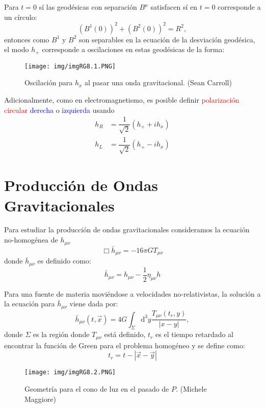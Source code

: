 \documentclass[../main]{subfiles}
\begin{document}
\begin{adjustwidth}{0pt}{-100pt}
Para $t=0$ sí las geodésicas con separación $B^{\mu}$ satisfacen sí en $t=0$ corresponde a un círculo:
\begin{equation}
    (B^1(0))^2+(B^2(0))^2=R^2,
\end{equation}
entonces como $B^1$ y $B^2$ son separables en la ecuación de la desviación geodésica, el modo $h_+$ corresponde a oscilaciones en estas geodésicas de la forma:

\begin{figure}[h]
    \begin{adjustwidth}{0pt}{-100pt}
    \centering
    \texttt{[image: img/imgRG8.1.PNG]}
    \label{fig8.1}
    \caption{Oscilación para $h_x$ al pasar una onda gravitacional. (Sean Carroll)}
    \end{adjustwidth}
\end{figure}

Adicionalmente, como en electromagnetismo, es posible definir \textcolor{red}{polarización circular} \textcolor{blue}{derecha} o \textcolor{blue}{izquierda} usando 
\begin{align}
    h_R&=\dfrac{1}{\sqrt{2}}(h_+ +ih_x)\\
    h_L&=\dfrac{1}{\sqrt{2}}(h_+ -ih_x)
\end{align}

\section{Producción de Ondas Gravitacionales}\label{part8.3}

Para estudiar la producción de ondas gravitacionales consideramos la ecuación no-homogénea de $h_{\mu\nu}$ 
\begin{equation}
    \Box \bar{h}_{\mu\nu}=-16\pi G T_{\mu\nu}
\end{equation}
donde $\bar{h}_{\mu\nu}$ es definido como:
\begin{equation}
    \bar{h}_{\mu\nu}=h_{\mu\nu}-\dfrac{1}{2}\eta_{\mu\nu}h
\end{equation}

Para una fuente de materia moviéndose a velocidades no-relativistas, la solución a la ecuación para $\bar{h}_{\mu\nu}$ viene dada por:
\begin{equation}
    \bar{h}_{\mu\nu}(t, \vec{x})=4G\int_{\Sigma}\mathrm{d}^3 y \dfrac{T_{\mu\nu}(t_r, y)}{|x-y|},
\end{equation}
donde $\Sigma$ es la región donde $T_{\mu\nu}$ está definido, $t_r$ es el tiempo retardado al encontrar la función de Green para el problema homogéneo y se define como:
\begin{equation}
    t_r=t-|\vec{x}-\vec{y}|
\end{equation}
\begin{figure}[h]
    \begin{adjustwidth}{0pt}{-100pt}
    \centering
    \texttt{[image: img/imgRG8.2.PNG]}
    \label{fig8.2}
    \caption{Geometría para el cono de luz en el pasado de $P$. (Michele Maggiore)}
    \end{adjustwidth}
\end{figure}


\end{adjustwidth}
\end{document}
